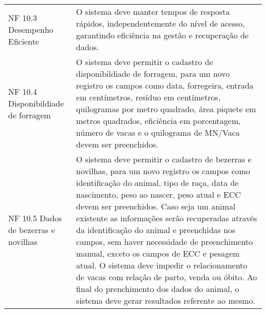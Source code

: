 \begin{tabframed}[htb]
\begin{tabular}{|l|l|}
    \multicolumn{1}{|p{3cm}|}{\raggedright NF 10.3 Desempenho Eficiente}          &
    \multicolumn{1}{|p{12cm}|}{\raggedright O sistema deve manter tempos de resposta rápidos, independentemente do nível de acesso, garantindo eficiência na gestão e recuperação de dados.}
    \\ \cline{1-2}

    \multicolumn{1}{|p{3cm}|}{\raggedright NF 10.4 Disponibildiade de forragem}   &
    \multicolumn{1}{|p{12cm}|}{\raggedright O sistema deve permitir o cadastro de disponibildiade de forragem, para um novo registro os campos como data, forregeira, entrada em centímetros, resíduo em centímetros, quilogramas por metro quadrado, área piquete em metros quadrados, eficiência em porcentagem, número de vacas e o quilograma de MN/Vaca devem ser preenchidos.}
    \\ \cline{1-2}

    \multicolumn{1}{|p{3cm}|}{\raggedright NF 10.5  Dados de bezerras e novilhas} &
    \multicolumn{1}{|p{12cm}|}{\raggedright O sistema deve permitir o cadastro de bezerras e novilhas, para um novo registro os campos como identificação do animal, tipo de raça, data de nascimento, peso ao nascer, peso atual e \gls{ECC} devem ser preenchidos. Caso seja um animal existente as informações serão recuperadas através da identificação do animal e preenchidas nos campos, sem haver necessidade de preenchimento manual, exceto os campos de \gls{ECC} e pesagem atual. O sistema deve impedir o relacionamento de vacas com relação de parto, venda ou óbito. Ao final do prenchimento dos dados do animal, o sistema deve gerar resultados referente ao mesmo.}
    \\ \cline{1-2}
  \end{tabular}
  \fonte{}
\end{tabframed}

